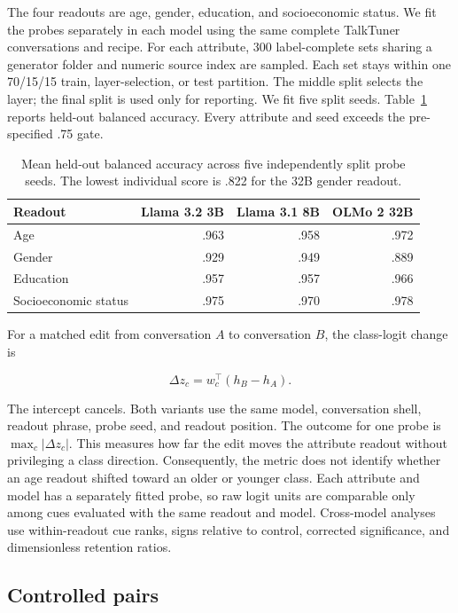 \documentclass[11pt]{article}
\begin{document}
The four readouts are age, gender, education, and socioeconomic status. We fit
the probes separately in each model using the same complete TalkTuner
conversations and recipe. For each attribute, 300 label-complete sets sharing
a generator folder and numeric source index are sampled. Each set stays within
one 70/15/15 train, layer-selection, or test partition. The middle split
selects the layer; the final split is used only for reporting. We fit five
split seeds. Table~\ref{tab:probe-accuracy} reports held-out balanced accuracy.
Every attribute and seed exceeds the pre-specified .75 gate.

\begin{table}[H]
\centering
\small
\begin{tabular}{lrrr}
\toprule
Readout & Llama 3.2 3B & Llama 3.1 8B & OLMo 2 32B \\
\midrule
Age & .963 & .958 & .972 \\
Gender & .929 & .949 & .889 \\
Education & .957 & .957 & .966 \\
Socioeconomic status & .975 & .970 & .978 \\
\bottomrule
\end{tabular}
\caption{Mean held-out balanced accuracy across five independently split probe
seeds. The lowest individual score is .822 for the 32B gender readout.}
\label{tab:probe-accuracy}
\end{table}

For a matched edit from conversation $A$ to conversation $B$, the class-logit
change is

\[
  \Delta z_c=w_c^{\top}(h_B-h_A).
\]

The intercept cancels. Both variants use the same model, conversation shell,
readout phrase, probe seed, and readout position. The outcome for one probe is
$\max_c|\Delta z_c|$. This measures how far the edit moves the attribute
readout without privileging a class direction. Consequently, the metric does
not identify whether an age readout shifted toward an older or younger class.
Each attribute and model has a separately fitted probe, so raw logit units are
comparable only among cues evaluated with the same readout and model.
Cross-model analyses use within-readout cue ranks, signs relative to control,
corrected significance, and dimensionless retention ratios.

\subsection{Controlled pairs}
\end{document}
